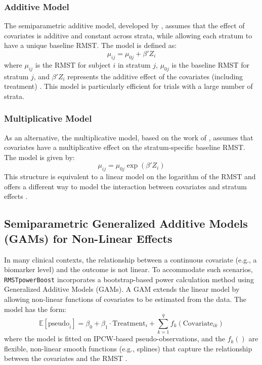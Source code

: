\documentclass[11pt, a4paper]{article}
\begin{document}
\subsubsection{Additive Model}
The semiparametric additive model, developed by \citet{zhang2024}, assumes that the effect of covariates is additive and constant across strata, while allowing each stratum to have a unique baseline RMST. The model is defined as:
\begin{equation}
\mu_{ij} = \mu_{0j} + \beta'Z_i
\end{equation}
where $\mu_{ij}$ is the RMST for subject $i$ in stratum $j$, $\mu_{0j}$ is the baseline RMST for stratum $j$, and $\beta'Z_i$ represents the additive effect of the covariates (including treatment) \cite{[1]}. This model is particularly efficient for trials with a large number of strata.

\subsubsection{Multiplicative Model}
As an alternative, the multiplicative model, based on the work of \citet{wang2019}, assumes that covariates have a multiplicative effect on the stratum-specific baseline RMST. The model is given by:
\begin{equation}
\mu_{ij} = \mu_{0j} \exp(\beta'Z_i)
\end{equation}
This structure is equivalent to a linear model on the logarithm of the RMST and offers a different way to model the interaction between covariates and stratum effects \cite{[1]}.

\subsection{Semiparametric Generalized Additive Models (GAMs) for Non-Linear Effects}
In many clinical contexts, the relationship between a continuous covariate (e.g., a biomarker level) and the outcome is not linear. To accommodate such scenarios, \texttt{RMSTpowerBoost} incorporates a bootstrap-based power calculation method using Generalized Additive Models (GAMs). A GAM extends the linear model by allowing non-linear functions of covariates to be estimated from the data. The model has the form:
\begin{equation}
\mathbb{E}[\text{pseudo}_i] = \beta_0 + \beta_1 \cdot \text{Treatment}_i + \sum_{k=1}^{q} f_k(\text{Covariate}_{ik})
\end{equation}
where the model is fitted on IPCW-based pseudo-observations, and the $f_k()$ are flexible, non-linear smooth functions (e.g., splines) that capture the relationship between the covariates and the RMST \cite{[1]}.
\end{document}
